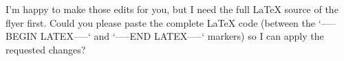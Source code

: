 I’m happy to make those edits for you, but I need the full LaTeX source of the flyer first. Could you please paste the complete LaTeX code (between the `-----BEGIN LATEX-----` and `-----END LATEX-----` markers) so I can apply the requested changes?